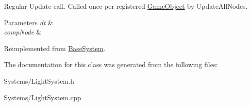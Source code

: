 Regular Update call. Called once per registered \hyperlink{classGameObject}{Game\+Object} by Update\+All\+Nodes. 


\begin{DoxyParams}{Parameters}
{\em dt} & \\
\hline
{\em comp\+Node} & \\
\hline
\end{DoxyParams}


Reimplemented from \hyperlink{classBaseSystem_a465191589a1ef8b8f3a8e20fa4656d47}{Base\+System}.



The documentation for this class was generated from the following files\+:\begin{DoxyCompactItemize}
\item 
Systems/Light\+System.\+h\item 
Systems/Light\+System.\+cpp\end{DoxyCompactItemize}
